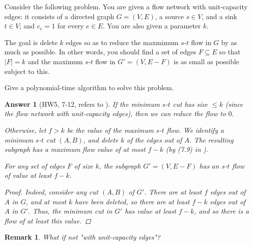\documentclass[11pt]{article}
\theoremstyle{numberplain}
\theoremstyle{nonumberplain}
\newtheorem{proof}{Proof}
\newtheorem{rem}{Remark}
\newtheorem{ans}{Answer}
\newcommand{\0}{{\mathbf{0}}}
\begin{document}
\begin{ques}[HW5, 7-12]
Consider the following problem.
You are given a flow network with unit-capacity edges:
it consists of a directed graph $G = (V,E)$, a source $s \in V$,
and a sink $t \in V$; and $c_e = 1$ for every $e \in E$.
You are also given a parameter $k$.\par

The goal is delete $k$ edges so as to reduce
the maxmimum $s$-$t$ flow in $G$ by as much as possible.
In other words, you should find a set of edges $F \subseteq E$
so that $|F| = k$ and
the maximum $s$-$t$ flow in $G' = (V,E - F)$ is as
small as possible subject to this.\par 

Give a polynomial-time algorithm to solve this problem.
\end{ques}
\begin{ans}[HW5, 7-12, refers to \cite{solcornell}]
If the minimum $s$-$t$ cut has size $\leq k$ (since the flow network with unit-capacity edges),
then we can reduce the flow to $0$.

Otherwise, let $f > k$ be the value of the maximum $s$-$t$ flow.
We identify a minimum $s$-$t$ cut $(A,B)$,
and delete $k$ of the edges out of $A$.
The resulting subgraph has a maximum flow value of at most $f - k$ (by (7.9) in \cite{jon2005algorithm}).
\begin{State}
For any set of edges $F$ of size $k$,
the subgraph $G' = (V,E - F)$ has an $s$-$t$ flow of value at least $f - k$.
\end{State}
\begin{proof}
Indeed, consider any cut $(A,B)$ of $G'$.
There are at least $f$ edges out of $A$ in $G$,
and at most $k$ have been deleted,
so there are at least $f - k$ edges out of $A$ in $G'$.
Thus, the minimum cut in $G'$ has value at least $f - k$,
and so there is a flow of at least this value.
\end{proof}
\end{ans}
\begin{rem}
What if not "with unit-capacity edges"?
\end{rem}
\end{document}
